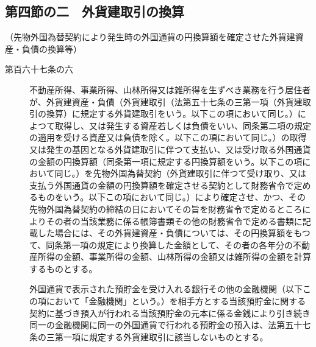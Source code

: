 \documentclass[twocolumn,a4j,10pt]{ltjtarticle}
\begin{document}
\subsection*{第四節の二　外貨建取引の換算}
\noindent\hspace{10pt}（先物外国為替契約により発生時の外国通貨の円換算額を確定させた外貨建資産・負債の換算等）
\begin{description}
\item[第百六十七条の六]不動産所得、事業所得、山林所得又は雑所得を生ずべき業務を行う居住者が、外貨建資産・負債（外貨建取引（法第五十七条の三第一項（外貨建取引の換算）に規定する外貨建取引をいう。以下この項において同じ。）によつて取得し、又は発生する資産若しくは負債をいい、同条第二項の規定の適用を受ける資産又は負債を除く。以下この項において同じ。）の取得又は発生の基因となる外貨建取引に伴つて支払い、又は受け取る外国通貨の金額の円換算額（同条第一項に規定する円換算額をいう。以下この項において同じ。）を先物外国為替契約（外貨建取引に伴つて受け取り、又は支払う外国通貨の金額の円換算額を確定させる契約として財務省令で定めるものをいう。以下この項において同じ。）により確定させ、かつ、その先物外国為替契約の締結の日においてその旨を財務省令で定めるところによりその者の当該業務に係る帳簿書類その他の財務省令で定める書類に記載した場合には、その外貨建資産・負債については、その円換算額をもつて、同条第一項の規定により換算した金額として、その者の各年分の不動産所得の金額、事業所得の金額、山林所得の金額又は雑所得の金額を計算するものとする。
\item[]外国通貨で表示された預貯金を受け入れる銀行その他の金融機関（以下この項において「金融機関」という。）を相手方とする当該預貯金に関する契約に基づき預入が行われる当該預貯金の元本に係る金銭により引き続き同一の金融機関に同一の外国通貨で行われる預貯金の預入は、法第五十七条の三第一項に規定する外貨建取引に該当しないものとする。
\end{description}
\end{document}
